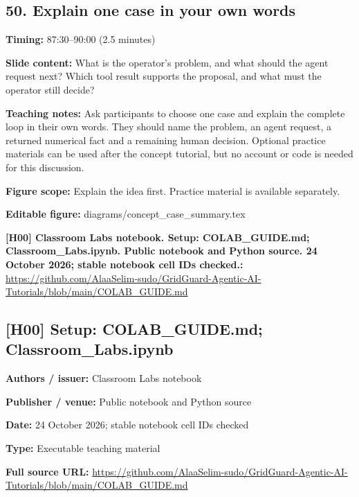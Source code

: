 \documentclass[10pt,letterpaper]{article}
\begin{document}
\subsection*{50. Explain one case in your own words}
\textbf{Timing:} 87:30--90:00 (2.5 minutes)\par
\textbf{Slide content:} What is the operator's problem, and what should the agent request next?
Which tool result supports the proposal, and what must the operator still decide?\par
\textbf{Teaching notes:} Ask participants to choose one case and explain the complete loop in their own words. They should name the problem, an agent request, a returned numerical fact and a remaining human decision. Optional practice materials can be used after the concept tutorial, but no account or code is needed for this discussion.\par
\textbf{Figure scope:} Explain the idea first. Practice material is available separately.\par
\textbf{Editable figure:} diagrams/concept\_case\_summary.tex\par
\textbf{[H00] Classroom Labs notebook. Setup: COLAB\_GUIDE.md; Classroom\_Labs.ipynb. Public notebook and Python source. 24 October 2026; stable notebook cell IDs checked.:} \href{https://github.com/AlaaSelim-sudo/GridGuard-Agentic-AI-Tutorials/blob/main/COLAB_GUIDE.md}{\small\ttfamily https:/\allowbreak{}/\allowbreak{}github.\allowbreak{}com/\allowbreak{}AlaaSelim-\allowbreak{}sudo/\allowbreak{}GridGuard-\allowbreak{}Agentic-\allowbreak{}AI-\allowbreak{}Tutorials/\allowbreak{}blob/\allowbreak{}main/\allowbreak{}COLAB\_\allowbreak{}GUIDE.\allowbreak{}md}\par
\par\medskip
\subsection*{[H00] Setup: COLAB\_GUIDE.md; Classroom\_Labs.ipynb}
\textbf{Authors / issuer:} Classroom Labs notebook\par
\textbf{Publisher / venue:} Public notebook and Python source\par
\textbf{Date:} 24 October 2026; stable notebook cell IDs checked\par
\textbf{Type:} Executable teaching material\par
\textbf{Full source URL:} \href{https://github.com/AlaaSelim-sudo/GridGuard-Agentic-AI-Tutorials/blob/main/COLAB_GUIDE.md}{\small\ttfamily https:/\allowbreak{}/\allowbreak{}github.\allowbreak{}com/\allowbreak{}AlaaSelim-\allowbreak{}sudo/\allowbreak{}GridGuard-\allowbreak{}Agentic-\allowbreak{}AI-\allowbreak{}Tutorials/\allowbreak{}blob/\allowbreak{}main/\allowbreak{}COLAB\_\allowbreak{}GUIDE.\allowbreak{}md}\par
\par\medskip
\end{document}
